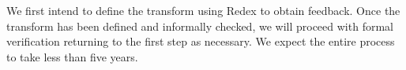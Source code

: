 \documentclass[11pt,ms]{byuprop}
\begin{document}
We first intend to define the transform using Redex to obtain feedback. Once the 
transform has been defined and informally checked, we will proceed with formal 
verification returning to the first step as necessary. We expect the entire process 
to take less than five years.





\end{document}
